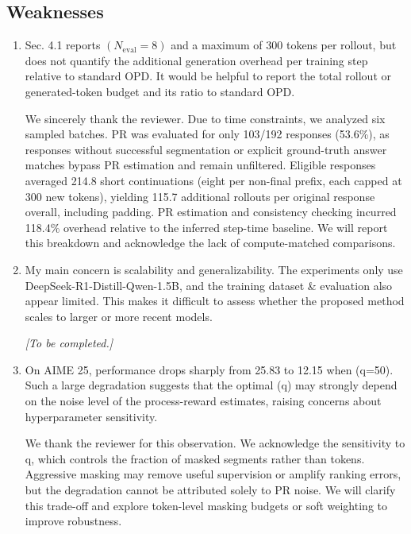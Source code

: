 \documentclass[11pt,a4paper]{article}
\begin{document}
\subsection*{Weaknesses}
\begin{enumerate}
\item Sec. 4.1 reports $(N_{\mathrm{eval}}=8)$ and a maximum of 300 tokens per rollout, but does not quantify the additional generation overhead per training step relative to standard OPD. It would be helpful to report the total rollout or generated-token budget and its ratio to standard OPD.
\par{}
\begin{responsebox}[frametitle={Response to W1}]
We sincerely thank the reviewer. Due to time constraints, we analyzed six sampled batches. PR was evaluated for only 103/192 responses (53.6\%), as responses without successful segmentation or explicit ground-truth answer matches bypass PR estimation and remain unfiltered. Eligible responses averaged 214.8 short continuations (eight per non-final prefix, each capped at 300 new tokens), yielding 115.7 additional rollouts per original response overall, including padding. PR estimation and consistency checking incurred 118.4\% overhead relative to the inferred step-time baseline. We will report this breakdown and acknowledge the lack of compute-matched comparisons.
\end{responsebox}

\item My main concern is scalability and generalizability. The experiments only use DeepSeek-R1-Distill-Qwen-1.5B, and the training dataset \& evaluation also appear limited. This makes it difficult to assess whether the proposed method scales to larger or more recent models.
\par{}
\begin{responsebox}[frametitle={Response to W2},nobreak=true]
\textit{[To be completed.]}\par\vspace{1em}
\end{responsebox}

\item On AIME 25, performance drops sharply from 25.83 to 12.15 when (q=50). Such a large degradation suggests that the optimal (q) may strongly depend on the noise level of the process-reward estimates, raising concerns about hyperparameter sensitivity.
\par{}
\begin{responsebox}[frametitle={Response to W3}]
We thank the reviewer for this observation. We acknowledge the sensitivity to q, which controls the fraction of masked segments rather than tokens. Aggressive masking may remove useful supervision or amplify ranking errors, but the degradation cannot be attributed solely to PR noise. We will clarify this trade-off and explore token-level masking budgets or soft weighting to improve robustness.
\end{responsebox}


\end{enumerate}
\end{document}
